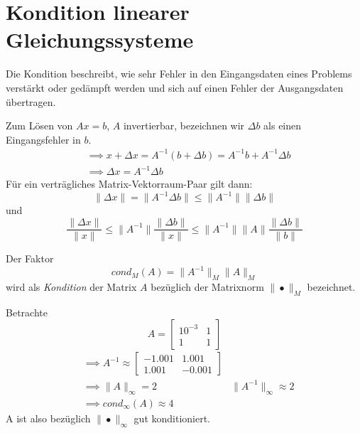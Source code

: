 \section{Kondition linearer Gleichungssysteme}
\begin{recall}
Die Kondition beschreibt, wie sehr Fehler in den Eingangsdaten eines Problems
verstärkt oder gedämpft werden und sich auf einen Fehler der Ausgangsdaten übertragen.
\end{recall}
Zum Lösen von $Ax=b$, $A$ invertierbar, bezeichnen wir $\Delta b$ als einen Eingangsfehler in $b$. 
\begin{align*}
&\implies x+ \Delta x = A^{-1}(b+\Delta b) = A^{-1}b +A^{-1} \Delta b \\
&\implies \Delta x= A^{-1} \Delta b
\end{align*}
Für ein verträgliches Matrix-Vektorraum-Paar gilt dann: 
\[
\|\Delta x\|= \|A^{-1} \Delta b\| \le \|A^{-1}\|\|\Delta b\| 
\]
und 
\[
	\frac{\|\Delta x\|}{\|x\|} \le \|A^{-1}\| \frac{\|\Delta b\|}{\|x\|}\le  \|A^{-1}\| \|A\| \frac{\|\Delta b\|}{\|b\|}
\]
\begin{definition}
Der Faktor 
\[
cond_M (A) = \|A^{-1}\|_M \|A\|_M 
\]
wird als \emph{Kondition} der Matrix $A$ bezüglich der Matrixnorm $\|•\|_M$ bezeichnet. 
\end{definition}
\begin{example}
	\label{eg:lgs-kondition}
Betrachte 
\[
A= \begin{bmatrix}
	10^{-3} & 1 \\
	1 & 1
\end{bmatrix}
\]
\begin{align*}
	&\implies A^{-1} \approx \begin{bmatrix}
		-1.001 & 1.001 \\
		1.001 & -0.001
	\end{bmatrix} \\
	&\implies \|A\|_{\infty} =2 & \|A^{-1}\|_{\infty} \approx 2 \\
	&\implies cond_{\infty}(A) \approx 4
\end{align*}
A ist also bezüglich $\|•\|_{\infty}$ gut konditioniert.
\end{example}
